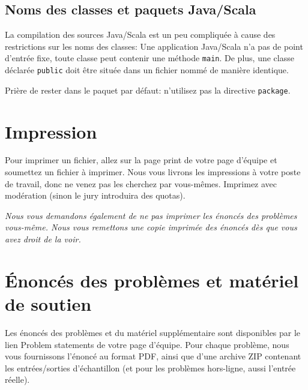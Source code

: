 \subsection{Noms des classes et paquets Java/Scala}
La compilation des sources Java/Scala est un peu compliquée
à cause des restrictions sur les noms des classes: 
Une application Java/Scala n'a pas de point d'entrée fixe, toute classe peut 
contenir une méthode \texttt{main}. De plus, 
une classe déclarée \texttt{public} doit être située
dans un fichier nommé de manière identique.

Prière de rester dans le paquet par défaut: n'utilisez pas
la directive \texttt{package}.

\section{Impression}
Pour imprimer un fichier, allez sur la page \og print \fg{}
de votre page d'équipe et soumettez un fichier à imprimer.
Nous vous livrons les impressions à votre poste de travail, 
donc ne venez pas les cherchez par vous-mêmes. 
Imprimez avec modération (sinon le jury introduira des quotas).

\emph{Nous vous demandons également de ne pas imprimer 
les énoncés des problèmes vous-même. Nous vous remettons une copie 
imprimée des énoncés dès que vous avez droit de la voir.}

\section{Énoncés des problèmes et matériel de soutien}
Les énoncés des problèmes et du matériel supplémentaire sont disponibles par le
lien \og Problem statements\fg{} de votre page d'équipe.
Pour chaque problème, nous vous fournissons l'énoncé
au format PDF, ainsi que d'une archive ZIP contenant
les entrées/sorties d'échantillon (et pour les problèmes hors-ligne, aussi
l'entrée réelle).

